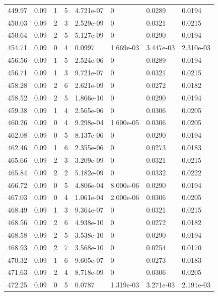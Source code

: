 \documentclass[preview]{standalone}
\begin{document}
{{{{{{{{{{{{\begin{tabular}{L{1.2cm}C{1.2cm} C{0.3cm}C{0.5cm} C{1.4cm}C{1.4cm} C{1.4cm}C{1.4cm}}
  449.97  &  0.09  & 1     &  5 &  4.721e-07  & 0  & 0.0289 &  0.0194   \\ 
  450.03  &  0.09  & 2     &  3 &  2.529e-09  & 0  & 0.0321 &  0.0215   \\ 
  450.64  &  0.09  & 2     &  5 &  5.127e-09  & 0  & 0.0290 &  0.0194   \\ 
  454.71  &  0.09  & 0     &  4 &  0.0997  & 1.669e-03  & 3.447e-03 &  2.310e-03   \\ 
  456.56  &  0.09  & 1     &  5 &  2.524e-06  & 0  & 0.0289 &  0.0194   \\ 
  456.71  &  0.09  & 1     &  3 &  9.721e-07  & 0  & 0.0321 &  0.0215   \\ 
  458.28  &  0.09  & 2     &  6 &  2.621e-09  & 0  & 0.0272 &  0.0182   \\ 
  458.52  &  0.09  & 2     &  5 &  1.866e-10  & 0  & 0.0290 &  0.0194   \\ 
  459.38  &  0.09  & 1     &  4 &  2.565e-06  & 0  & 0.0306 &  0.0205   \\ 
  460.26  &  0.09  & 0     &  4 &  9.298e-04  & 1.600e-05  & 0.0306 &  0.0205   \\ 
  462.08  &  0.09  & 0     &  5 &  8.137e-06  & 0  & 0.0290 &  0.0194   \\ 
  462.46  &  0.09  & 1     &  6 &  2.355e-06  & 0  & 0.0273 &  0.0183   \\ 
  465.66  &  0.09  & 2     &  3 &  3.209e-09  & 0  & 0.0321 &  0.0215   \\ 
  465.84  &  0.09  & 2     &  2 &  5.182e-09  & 0  & 0.0332 &  0.0222   \\ 
  466.72  &  0.09  & 0     &  5 &  4.806e-04  & 8.000e-06  & 0.0290 &  0.0194   \\ 
  467.03  &  0.09  & 0     &  4 &  1.061e-04  & 2.000e-06  & 0.0306 &  0.0205   \\ 
  468.49  &  0.09  & 1     &  3 &  9.364e-07  & 0  & 0.0321 &  0.0215   \\ 
  468.56  &  0.09  & 2     &  6 &  4.938e-10  & 0  & 0.0272 &  0.0182   \\ 
  468.58  &  0.09  & 2     &  5 &  3.538e-10  & 0  & 0.0290 &  0.0194   \\ 
  468.93  &  0.09  & 2     &  7 &  3.568e-10  & 0  & 0.0254 &  0.0170   \\ 
  470.32  &  0.09  & 1     &  6 &  9.605e-07  & 0  & 0.0273 &  0.0183   \\ 
  471.63  &  0.09  & 2     &  4 &  8.718e-09  & 0  & 0.0306 &  0.0205   \\ 
  472.25  &  0.09  & 0     &  5 &  0.0787  & 1.319e-03  & 3.271e-03 &  2.191e-03   \\ 

\end{tabular}}}}}}}}}}}}}
\end{document}
